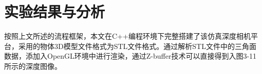 \clearpage



\newpage

\section{实验结果与分析}

按照上文所述的流程框架，本文在C++编程环境下完整搭建了该仿真深度相机平台，采用的物体3D模型文件格式为STL文件格式。通过解析STL文件中的三角面数据，添加入OpenGL环境中进行渲染，通过Z-buffer技术可以直接得到入图3-11所示的深度图像。
\begin{figure}[htb]
\end{figure}
